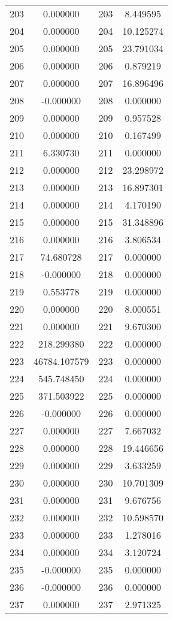\documentclass[12pt]{article}
\begin{document}
\begin{longtable}{@{}cccc@{}}
203 & 0.000000 & 203 & 8.449595 \\
204 & 0.000000 & 204 & 10.125274 \\
205 & 0.000000 & 205 & 23.791034 \\
206 & 0.000000 & 206 & 0.879219 \\
207 & 0.000000 & 207 & 16.896496 \\
208 & -0.000000 & 208 & 0.000000 \\
209 & 0.000000 & 209 & 0.957528 \\
210 & 0.000000 & 210 & 0.167499 \\
211 & 6.330730 & 211 & 0.000000 \\
212 & 0.000000 & 212 & 23.298972 \\
213 & 0.000000 & 213 & 16.897301 \\
214 & 0.000000 & 214 & 4.170190 \\
215 & 0.000000 & 215 & 31.348896 \\
216 & 0.000000 & 216 & 3.806534 \\
217 & 74.680728 & 217 & 0.000000 \\
218 & -0.000000 & 218 & 0.000000 \\
219 & 0.553778 & 219 & 0.000000 \\
220 & 0.000000 & 220 & 8.000551 \\
221 & 0.000000 & 221 & 9.670300 \\
222 & 218.299380 & 222 & 0.000000 \\
223 & 46784.107579 & 223 & 0.000000 \\
224 & 545.748450 & 224 & 0.000000 \\
225 & 371.503922 & 225 & 0.000000 \\
226 & -0.000000 & 226 & 0.000000 \\
227 & 0.000000 & 227 & 7.667032 \\
228 & 0.000000 & 228 & 19.446656 \\
229 & 0.000000 & 229 & 3.633259 \\
230 & 0.000000 & 230 & 10.701309 \\
231 & 0.000000 & 231 & 9.676756 \\
232 & 0.000000 & 232 & 10.598570 \\
233 & 0.000000 & 233 & 1.278016 \\
234 & 0.000000 & 234 & 3.120724 \\
235 & -0.000000 & 235 & 0.000000 \\
236 & -0.000000 & 236 & 0.000000 \\
237 & 0.000000 & 237 & 2.971325 \\

\end{longtable}
\end{document}
